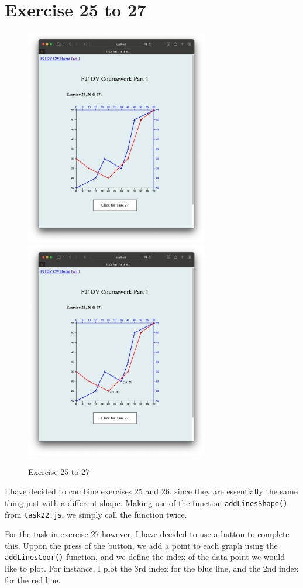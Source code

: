 \documentclass{scrreprt}
\begin{document}
\section{Exercise 25 to 27}
\begin{figure}[!ht]
    \centering
    \includegraphics[width = 8cm]{images/ex25_1.png}
    \includegraphics[width = 8cm]{images/ex25_2.png}
    \label{fig:ex25}
    \caption{Exercise 25 to 27}
\end{figure}
\FloatBarrier

I have decided to combine exercises 25 and 26, since they are essentially the same thing just with a 
different shape. Making use of the function \verb|addLinesShape()| from \verb|task22.js|, we simply call
the function twice. \\
\par For the task in exercise 27 however, I have decided to use a button to complete this. Uppon the
press of the button, we add a point to each graph using the \verb|addLinesCoor()| function, and we define
the index of the data point we would like to plot. For instance, I plot the 3rd index for the blue line,
and the 2nd index for the red line.
\end{document}
